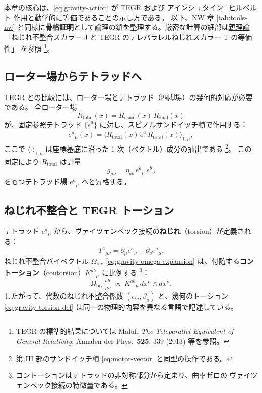 \documentclass[dvipdfmx,a4paper,oneside]{jsbook}
\numberwithin{equation}{chapter}
\begin{document}
本章の核心は、\eqref{eq:gravity-action} が TEGR および アインシュタイン=ヒルベルト 作用と動学的に等価であることの示し方である。
以下、NW 章 \eqref{tab:tools-nw} と同様に\textbf{骨格証明}として論理の鎖を整理する。厳密な計算の細部は\hyperref[sec:sister-manuscripts]{親理論}「ねじれ不整合スカラー J と TEGR のテレパラレルねじれスカラー T の等価性」 を参照 \footnote{TEGR の標準的結果については Maluf, \textit{The Teleparallel Equivalent of General Relativity}, Annalen der Phys.\ \textbf{525}, 339 (2013) 等を参照。}。

\subsection{ローター場からテトラッドへ}

TEGR との比較には、ローター場とテトラッド（四脚場）の幾何的対応が必要である。
全ローター場
\begin{equation}
  R_{\mathrm{total}}(x) = R_{\mathrm{usual}}(x)\, R_{\mathrm{dual}}(x)
  \label{eq:gravity-R-total}
\end{equation}
が、固定参照テトラッド \(\{\mathring{e}^a\}\) に対し、スピノルサンドイッチ積で作用する：
\begin{equation}
  e^a{}_\mu(x)
  = \bigl\langle R_{\mathrm{total}}(x)\, \mathring{e}^a\, R_{\mathrm{total}}^\dagger(x) \bigr\rangle_{1,\mu},
  \label{eq:gravity-tetrad}
\end{equation}
ここで \(\langle \cdot \rangle_{1,\mu}\) は座標基底に沿った 1 次（ベクトル）成分の抽出である \footnote{第 III 部のサンドイッチ積 \eqref{eq:motor-vector} と同型の操作である。}。
この同定により \(R_{\mathrm{total}}\) は計量
\begin{equation}
  g_{\mu\nu} = \eta_{ab}\, e^a{}_\mu\, e^b{}_\nu
  \label{eq:gravity-metric}
\end{equation}
をもつテトラッド場 \(e^a{}_\mu\) へと昇格する。

\subsection{ねじれ不整合と TEGR トーション}

テトラッド \(e^a{}_\mu\) から、ヴァイツェンベック接続の\textbf{ねじれ}（torsion）が定義される：
\begin{equation}
  T^a{}_{\mu\nu} = \partial_\mu e^a{}_\nu - \partial_\nu e^a{}_\mu.
  \label{eq:gravity-torsion-def}
\end{equation}
ねじれ不整合バイベクトル \(\Omega_{\mathrm{biv}}\) \eqref{eq:gravity-omega-expansion} は、付随する\textbf{コントーション}（contorsion）\(K^{ab}{}_\mu\) に比例する \footnote{コントーションはテトラッドの非対称部分から定まり、曲率ゼロの ヴァイツェンベック接続の特徴量である。}：
\begin{equation}
  \Omega_{\mathrm{biv}}\big|_{\mu\nu}^{ab}
  \;\propto\;
  K^{ab}{}_\mu\, dx^\mu \wedge dx^\nu.
  \label{eq:gravity-contorsion}
\end{equation}
したがって、代数のねじれ不整合係数 \((\alpha_a, \beta_a)\) と、幾何のトーション \eqref{eq:gravity-torsion-def} は同一の物理的内容を異なる言語で記述している。
\end{document}
